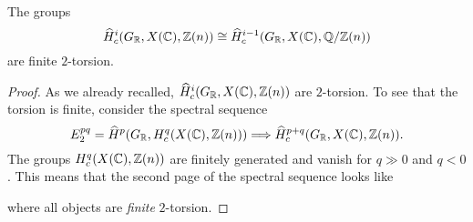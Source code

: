 \documentclass{article}
\numberwithin{equation}{section}
\begin{document}
\begin{lemma}
  \label{lemma:H-hat-c-GR-X(C)-Z(n)-finite-2-torsion}
  The groups
  \[ \widehat{H}_c^i (G_{\mathbb{R}}, X (\mathbb{C}), \mathbb{Z} (n)) \cong
  \widehat{H}_c^{i-1} (G_{\mathbb{R}}, X (\mathbb{C}), \mathbb{Q}/\mathbb{Z} (n)) \]
  are finite $2$-torsion.

  \begin{proof}
    As we already recalled, $\widehat{H}_c^i (G_{\mathbb{R}}, X (\mathbb{C}), \mathbb{Z} (n))$
    are $2$-torsion. To see that the torsion is finite, consider the spectral
    sequence
    \[ E_2^{pq} = \widehat{H}^p (G_{\mathbb{R}}, H^q_c (X (\mathbb{C}), \mathbb{Z} (n)))
    \Longrightarrow
    \widehat{H}^{p+q}_c (G_{\mathbb{R}}, X (\mathbb{C}), \mathbb{Z} (n)). \]
    The groups $H^q_c (X (\mathbb{C}), \mathbb{Z} (n))$ are finitely generated and vanish for
    $q \gg 0$ and $q < 0$. This means that the second page of the spectral
    sequence looks like

    \begin{center}
    \end{center}

    \noindent where all objects are \emph{finite} $2$-torsion.
  \end{proof}
\end{lemma}
\end{document}
